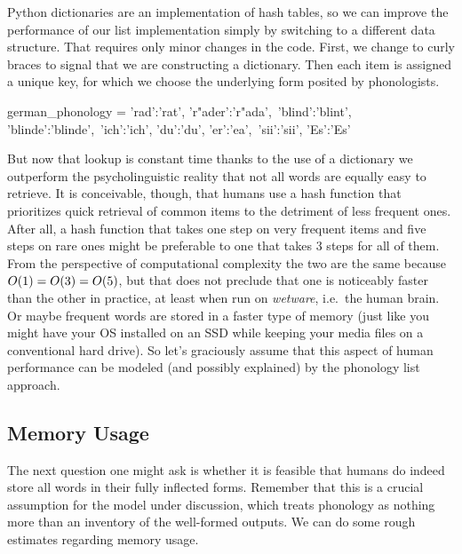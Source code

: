 Python dictionaries are an implementation of hash tables, so we can improve the performance of our list implementation simply by switching to a different data structure.
That requires only minor changes in the code.
First, we change to curly braces to signal that we are constructing a dictionary.
Then each item is assigned a unique key, for which we choose the underlying form posited by phonologists.

\begin{pythoncode}
    german_phonology = {'rad':'rat', 'r"ader':'r"ada',\
                        'blind':'blint', 'blinde':'blinde',\
                        'ich':'ich', 'du':'du', 'er':'ea',\
                        'sii':'sii', 'Es':'Es'}
\end{pythoncode}

But now that lookup is constant time thanks to the use of a dictionary we outperform the psycholinguistic reality that not all words are equally easy to retrieve.
It is conceivable, though, that humans use a hash function that prioritizes quick retrieval of common items to the detriment of less frequent ones.
After all, a hash function that takes one step on very frequent items and five steps on rare ones might be preferable to one that takes 3 steps for all of them.
From the perspective of computational complexity the two are the same because $O(1) = O(3) = O(5)$, but that does not preclude that one is noticeably faster than the other in practice, at least when run on \emph{wetware}, i.e.\ the human brain.
Or maybe frequent words are stored in a faster type of memory (just like you might have your OS installed on an SSD while keeping your media files on a conventional hard drive).
So let's graciously assume that this aspect of human performance can be modeled (and possibly explained) by the phonology list approach.

\subsection{Memory Usage}

The next question one might ask is whether it is feasible that humans do indeed store all words in their fully inflected forms.
Remember that this is a crucial assumption for the model under discussion, which treats phonology as nothing more than an inventory of the well-formed outputs.
We can do some rough estimates regarding memory usage.

